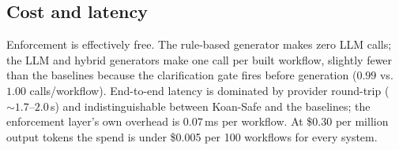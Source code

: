 

\subsection{Cost and latency}
\label{sec:cost}

Enforcement is effectively free. The rule-based generator makes zero LLM
calls; the LLM and hybrid generators make one call per built workflow,
slightly fewer than the baselines because the clarification gate fires
before generation ($0.99$ vs.\ $1.00$ calls/workflow). End-to-end latency
is dominated by provider round-trip (${\sim}1.7$--$2.0$\,s) and
indistinguishable between Koan-Safe and the baselines; the enforcement
layer's own overhead is $0.07$\,ms per workflow. At \$0.30 per million
output tokens the spend is under \$0.005 per 100 workflows for every
system.
